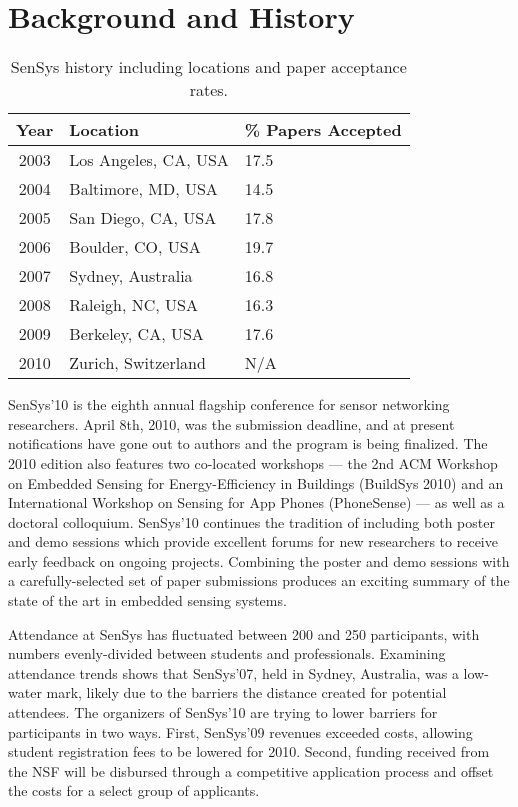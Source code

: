 \documentclass[11pt,letterpaper]{article}
\begin{document}
\section*{Background and History}

\begin{table}[t]
\begin{center}
\begin{tabular}{|c|ll|}
\hline
\textbf{Year} & \textbf{Location} & \textbf{\% Papers Accepted} \\
\hline \hline
2003 & Los Angeles, CA, USA & 17.5 \\
2004 & Baltimore, MD, USA & 14.5 \\
2005 & San Diego, CA, USA & 17.8 \\
2006 & Boulder, CO, USA & 19.7 \\
2007 & Sydney, Australia & 16.8 \\
2008 & Raleigh, NC, USA & 16.3 \\
2009 & Berkeley, CA, USA & 17.6 \\
2010 & Zurich, Switzerland & N/A \\
\hline
\end{tabular}
\end{center}
\caption{SenSys history including locations and paper acceptance rates.}
\label{table-history}
\end{table}

SenSys'10 is the eighth annual flagship conference for sensor networking
researchers. April 8th, 2010, was the submission deadline, and at present
notifications have gone out to authors and the program is being finalized.
The 2010 edition also features two co-located workshops --- the 2nd ACM
Workshop on Embedded Sensing for Energy-Efficiency in Buildings (BuildSys
2010) and an International Workshop on Sensing for App Phones (PhoneSense)
--- as well as a doctoral colloquium. SenSys'10 continues the tradition of
including both poster and demo sessions which provide excellent forums for
new researchers to receive early feedback on ongoing projects. Combining the
poster and demo sessions with a carefully-selected set of paper submissions
produces an exciting summary of the state of the art in embedded sensing
systems.

Attendance at SenSys has fluctuated between 200 and 250 participants, with
numbers evenly-divided between students and professionals. Examining
attendance trends shows that SenSys'07, held in Sydney, Australia, was a
low-water mark, likely due to the barriers the distance created for potential
attendees. The organizers of SenSys'10 are trying to lower barriers for
participants in two ways. First, SenSys'09 revenues exceeded costs, allowing
student registration fees to be lowered for 2010. Second, funding received
from the NSF will be disbursed through a competitive application process and
offset the costs for a select group of applicants.
\end{document}
